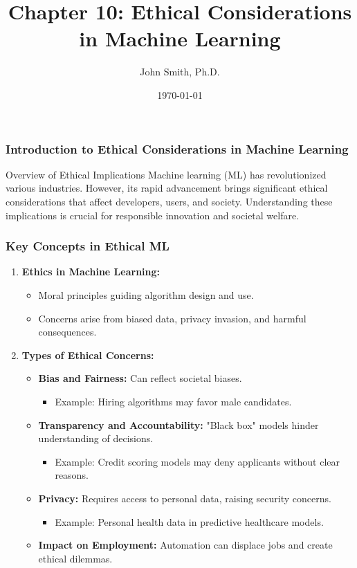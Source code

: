 \documentclass[aspectratio=169]{beamer}
\title[Ethical Considerations in ML]{Chapter 10: Ethical Considerations in Machine Learning}
\author[J. Smith]{John Smith, Ph.D.}
\institute[University Name]{
  Department of Computer Science\\
  University Name\\
  \vspace{0.3cm}
  Email: email@university.edu\\
  Website: www.university.edu
}
\date{\today}
\begin{document}
\frame{\titlepage}

\begin{frame}[fragile]
    \frametitle{Introduction to Ethical Considerations in Machine Learning}
    \begin{block}{Overview of Ethical Implications}
        Machine learning (ML) has revolutionized various industries. 
        However, its rapid advancement brings significant ethical considerations that affect developers, users, and society.
        Understanding these implications is crucial for responsible innovation and societal welfare.
    \end{block}
\end{frame}

\begin{frame}[fragile]
    \frametitle{Key Concepts in Ethical ML}
    \begin{enumerate}
        \item \textbf{Ethics in Machine Learning:}
        \begin{itemize}
            \item Moral principles guiding algorithm design and use.
            \item Concerns arise from biased data, privacy invasion, and harmful consequences.
        \end{itemize}
        
        \item \textbf{Types of Ethical Concerns:}
        \begin{itemize}
            \item \textbf{Bias and Fairness:} Can reflect societal biases. 
                \begin{itemize}
                    \item Example: Hiring algorithms may favor male candidates.
                \end{itemize}
            \item \textbf{Transparency and Accountability:} "Black box" models hinder understanding of decisions. 
                \begin{itemize}
                    \item Example: Credit scoring models may deny applicants without clear reasons.
                \end{itemize}
            \item \textbf{Privacy:} Requires access to personal data, raising security concerns.
                \begin{itemize}
                    \item Example: Personal health data in predictive healthcare models.
                \end{itemize}
            \item \textbf{Impact on Employment:} Automation can displace jobs and create ethical dilemmas.
        \end{itemize}
    \end{enumerate}
\end{frame}
\end{document}
